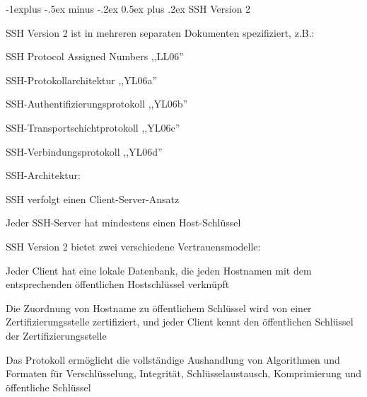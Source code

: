 \documentclass[a4paper]{article}
\makeatletter
\renewcommand{\subsection}{\@startsection{subsection}{2}{0mm}%
 {-1explus -.5ex minus -.2ex}%
 {0.5ex plus .2ex}%
 {\normalfont\normalsize\bfseries}}
\makeatother
\begin{document}
\begin{multicols}{3}
\begin{itemize*}
            \subsection{SSH Version 2}
            \begin{itemize*}
                  \item SSH Version 2 ist in mehreren separaten Dokumenten spezifiziert, z.B.:
                  \begin{itemize*}
                        \item SSH Protocol Assigned Numbers ,,LL06''
                        \item SSH-Protokollarchitektur ,,YL06a''
                        \item SSH-Authentifizierungsprotokoll ,,YL06b''
                        \item SSH-Transportschichtprotokoll ,,YL06c''
                        \item SSH-Verbindungsprotokoll ,,YL06d''
                  \end{itemize*}
                  \item SSH-Architektur:
                  \begin{itemize*}
                        \item SSH verfolgt einen Client-Server-Ansatz
                        \item Jeder SSH-Server hat mindestens einen Host-Schlüssel
                        \item SSH Version 2 bietet zwei verschiedene Vertrauensmodelle:
                        \begin{itemize*} \item Jeder Client hat eine lokale Datenbank, die jeden Hostnamen mit dem entsprechenden öffentlichen Hostschlüssel verknüpft \item Die Zuordnung von Hostname zu öffentlichem Schlüssel wird von einer Zertifizierungsstelle zertifiziert, und jeder Client kennt den öffentlichen Schlüssel der Zertifizierungsstelle \end{itemize*}
                        \item Das Protokoll ermöglicht die vollständige Aushandlung von Algorithmen und Formaten für Verschlüsselung, Integrität, Schlüsselaustausch, Komprimierung und öffentliche Schlüssel
                  \end{itemize*}
            \end{itemize*}


\end{itemize*}
\end{multicols}
\end{document}
